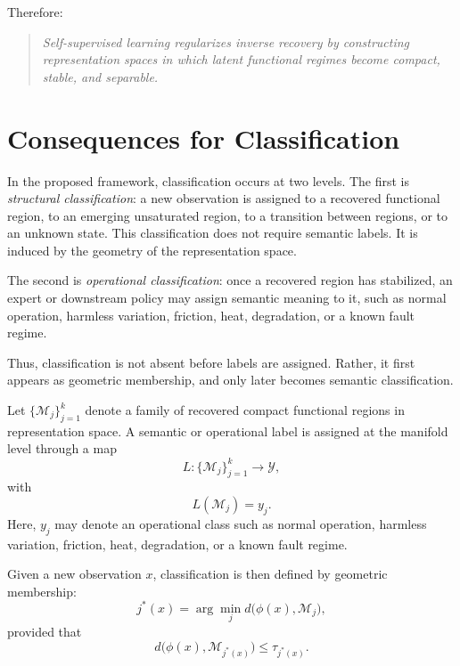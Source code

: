 \documentclass[11pt,a4paper]{article}
\begin{document}
Therefore:

\begin{quote}
\emph{Self-supervised learning regularizes inverse recovery by constructing representation spaces in which latent functional regimes become compact, stable, and separable.}
\end{quote}

\section{Consequences for Classification}

In the proposed framework, classification occurs at two levels. The first is 
\emph{structural classification}: a new observation is assigned to a recovered 
functional region, to an emerging unsaturated region, to a transition between 
regions, or to an unknown state. This classification does not require semantic 
labels. It is induced by the geometry of the representation space.

The second is \emph{operational classification}: once a recovered region has 
stabilized, an expert or downstream policy may assign semantic meaning to it, 
such as normal operation, harmless variation, friction, heat, degradation, or a 
known fault regime.

Thus, classification is not absent before labels are assigned. Rather, it first 
appears as geometric membership, and only later becomes semantic classification.

Let $\{\mathcal{M}_j\}_{j=1}^{k}$ denote a family of recovered compact functional regions in representation space. A semantic or operational label is assigned at the manifold level through a map
\begin{equation}
L : \{\mathcal{M}_j\}_{j=1}^{k} \longrightarrow \mathcal{Y},
\end{equation}
with
\begin{equation}
L(\mathcal{M}_j)=y_j.
\end{equation}
Here, $y_j$ may denote an operational class such as normal operation, harmless variation, friction, heat, degradation, or a known fault regime.

Given a new observation $x$, classification is then defined by geometric membership:
\begin{equation}
j^*(x) =
\arg\min_j d\bigl(\phi(x),\mathcal{M}_j\bigr),
\end{equation}
provided that
\begin{equation}
d\bigl(\phi(x),\mathcal{M}_{j^*(x)}\bigr) \leq \tau_{j^*(x)}.
\end{equation}
\end{document}
